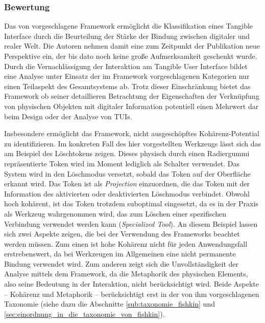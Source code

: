 
\subsubsection{Bewertung} %
\label{sub:bewertung}

Das von \citep{Koleva03} vorgeschlagene Framework ermöglicht die Klassifikation eines Tangible Interface durch die Beurteilung der Stärke der Bindung zwischen digitaler und realer Welt. Die Autoren nehmen damit eine zum Zeitpunkt der Publikation neue Perspektive ein, der bis dato noch keine große Aufmerksamkeit geschenkt wurde. Durch die Vernachlässigung der Interaktion am Tangible User Interface bildet eine Analyse unter Einsatz der im Framework vorgeschlagenen Kategorien nur einen Teilaspekt des Gesamtsystems ab. Trotz dieser Einschränkung bietet das Framework ob seiner detaillieren Betrachtung der Eigenschaften der Verknüpfung von physischen Objekten mit digitaler Information potentiell einen Mehrwert dar beim Design oder der Analyse von \glspl{TUI}. 

Insbesondere ermöglicht das Framework, nicht ausgeschöpftes Kohärenz-Potential zu identifizieren. Im konkreten Fall des hier vorgestellten Werkzeugs lässt sich das am Beispiel des Löschtokens zeigen. Dieses physisch durch einen Radiergummi repräsentierte Token wird im Moment lediglich als Schalter verwendet. Das System wird in den Löschmodus versetzt, sobald das Token auf der Oberfläche erkannt wird. Das Token ist als \emph{Projection} einzuordnen, die das Token mit der Information des aktivierten oder deaktivierten Löschmodus verbindet. Obwohl hoch kohärent, ist das Token trotzdem suboptimal eingesetzt, da es in der Praxis als Werkzeug wahrgenommen wird, das zum Löschen einer spezifischen Verbindung verwendet werden kann (\emph{Specialized Tool}). An diesem Beispiel lassen sich zwei Aspekte zeigen, die bei der Verwendung des Frameworks beachtet werden müssen. Zum einen ist hohe Kohärenz nicht für jeden Anwendungsfall erstrebenswert, da bei Werkzeugen im Allgemeinen eine nicht permanente Bindung verwendet wird. Zum anderen zeigt sich die Unvollständigkeit der Analyse mittels dem Framework, da die Metaphorik des physischen Elements, also seine Bedeutung in der Interaktion, nicht berücksichtigt wird. Beide Aspekte -- Kohärenz und Metaphorik -- berücksichtigt erst \citet{Fishkin04} in der von ihm vorgeschlagenen Taxonomie (siehe dazu die Abschnitte \ref{sub:taxonomie_fishkin} und \ref{sec:einordnung_in_die_taxonomie_von_fishkin}).

